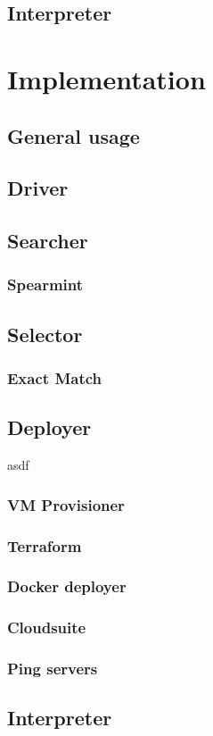 \documentclass{report}
\begin{document}
\section{Interpreter}
\chapter{Implementation}
\section{General usage}
\section{Driver}
\section{Searcher}
\subsection{Spearmint}
\section{Selector}
\subsection{Exact Match}
\section{Deployer}
asdf 
\subsection{VM Provisioner}
\subsection{Terraform}
\subsection{Docker deployer}
\subsection{Cloudsuite}
\subsection{Ping servers}
\section{Interpreter}
\end{document}
